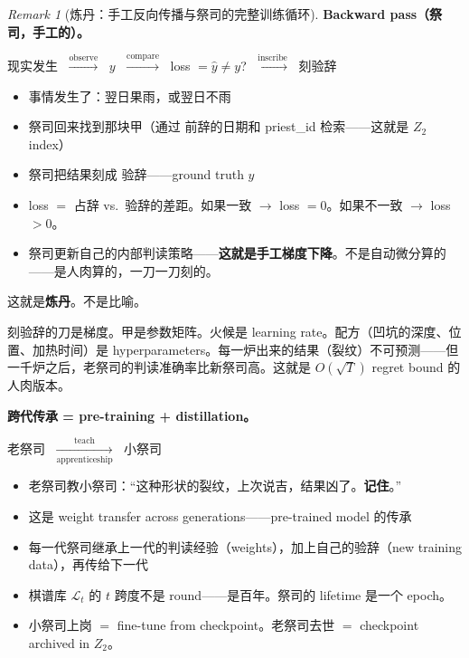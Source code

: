\documentclass[11pt,a4paper]{article}
\theoremstyle{definition}
\theoremstyle{remark}
\newtheorem{remark}[theorem]{Remark}
\begin{document}
\begin{remark}[炼丹：手工反向传播与祭司的完整训练循环]
\textbf{Backward pass（祭司，手工的）。}

\begin{center}
{\color{green!50!black} 现实发生} $\;\xrightarrow{\text{observe}}\;$ {\color{green!50!black} $y$} $\;\xrightarrow{\text{compare}}\;$ {\color{magenta!70!black} loss $= \hat{y} \neq y$?} $\;\xrightarrow{\text{inscribe}}\;$ {\color{green!50!black} 刻验辞}
\end{center}

\begin{itemize}[nosep]
  \item 事情发生了：翌日果雨，或翌日不雨
  \item 祭司回来找到那块甲（通过{\color{gray!60} 前辞}的日期和 priest\_id 检索——这就是 $Z_2$ index）
  \item 祭司把结果刻成{\color{green!50!black} 验辞}——ground truth $y$
  \item {\color{magenta!70!black} loss $= $ 占辞 vs.\ 验辞的差距}。如果一致 $\to$ loss $= 0$。如果不一致 $\to$ loss $> 0$。
  \item 祭司更新自己的内部判读策略——\textbf{这就是手工梯度下降}。不是自动微分算的——是人肉算的，一刀一刀刻的。
\end{itemize}

这就是\textbf{炼丹}。不是比喻。

刻验辞的刀是梯度。甲是参数矩阵。火候是 learning rate。配方（凹坑的深度、位置、加热时间）是 hyperparameters。每一炉出来的结果（裂纹）不可预测——但一千炉之后，老祭司的判读准确率比新祭司高。这就是 $O(\sqrt{T})$ regret bound 的人肉版本。

\textbf{跨代传承 = pre-training + distillation。}

\begin{center}
{\color{violet!70!black} 老祭司} $\;\xrightarrow[\text{apprenticeship}]{\text{teach}}\;$ {\color{violet!70!black} 小祭司}
\end{center}

\begin{itemize}[nosep]
  \item 老祭司教小祭司：``这种形状的裂纹，上次说吉，结果凶了。\textbf{记住}。''
  \item 这是 weight transfer across generations——pre-trained model 的传承
  \item 每一代祭司继承上一代的判读经验（weights），加上自己的验辞（new training data），再传给下一代
  \item 棋谱库 $\mathcal{L}_t$ 的 $t$ 跨度不是 round——是百年。祭司的 lifetime 是一个 epoch。
  \item 小祭司上岗 $=$ fine-tune from checkpoint。老祭司去世 $=$ checkpoint archived in $Z_2$。
\end{itemize}


\end{remark}
\end{document}
